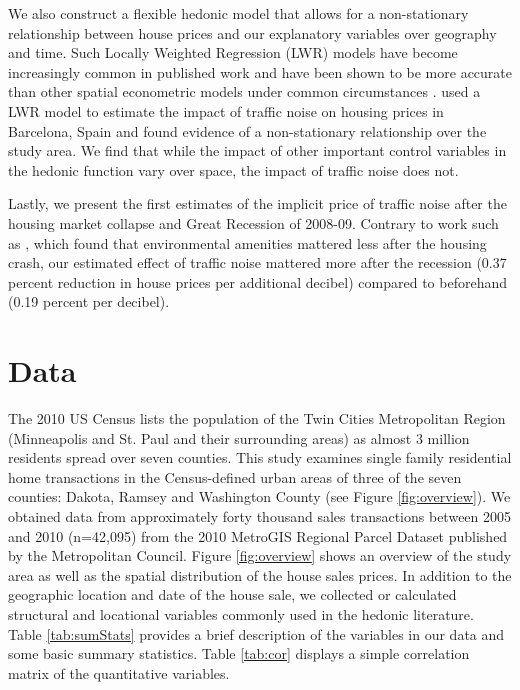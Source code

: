 \documentclass{article}\usepackage{graphicx, color}
\begin{document}
We also construct a flexible hedonic model that allows for a non-stationary relationship between house prices and our explanatory variables over geography and time. Such Locally Weighted Regression (LWR) models have become increasingly common in published work \citep[see][]{MarmolejoDuarteCarlos;GonzalezTamez2009, Carruthers2010, Sunding2010, Nappi-Choulet2011} and have been shown to be more accurate than other spatial econometric models under common circumstances \citep{McMillen2012}. \citet{MarmolejoDuarteCarlos;GonzalezTamez2009} used a LWR model to estimate the impact of traffic noise on housing prices in Barcelona, Spain and found evidence of a non-stationary relationship over the study area. We find that while the impact of other important control variables in the hedonic function vary over space, the impact of traffic noise does not. 

Lastly, we present the first estimates of the implicit price of traffic noise after the housing market collapse and Great Recession of 2008-09. Contrary to work such as \citet{Cho2011b}, which found that environmental amenities mattered less after the housing crash, our estimated effect of traffic noise mattered more after the recession (0.37 percent reduction in house prices per additional decibel) compared to beforehand (0.19 percent per decibel).
 
\section{Data}
The 2010 US Census lists the population of the Twin Cities Metropolitan Region (Minneapolis and St. Paul and their surrounding areas)  as almost 3 million residents spread over seven counties. This study examines single family residential home transactions in the Census-defined urban areas of three of the seven counties: Dakota, Ramsey and Washington County (see Figure \ref{fig:overview}). We obtained data from approximately forty thousand sales transactions between 2005 and 2010 (n=42,095) from the 2010 MetroGIS Regional Parcel Dataset published by the Metropolitan Council. Figure \ref{fig:overview} shows an overview of the study area as well as the spatial distribution of the house sales prices. In addition to the geographic location and date of the house sale, we collected or calculated structural and locational variables commonly used in the hedonic literature. Table \ref{tab:sumStats} provides a brief description of the variables in our data and some basic summary statistics. Table \ref{tab:cor} displays a simple correlation matrix of the quantitative variables.
\end{document}
